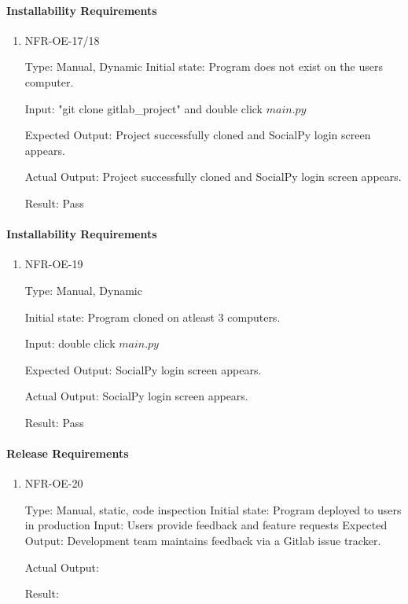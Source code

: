 \documentclass[12pt, titlepage]{article}
\begin{document}
  \paragraph{Installability Requirements}
\begin{enumerate}
    \item{NFR-OE-17/18 \\}
    
    Type: Manual, Dynamic
    Initial state: Program does not exist on the users computer.
    
    Input: "git clone gitlab\_project" and double click $main.py$
    
    Expected Output: Project successfully cloned and SocialPy login screen appears.
    
    Actual Output: Project successfully cloned and SocialPy login screen appears.
    					
    Result: Pass
    

 \end{enumerate} 
 
   \paragraph{Installability Requirements}
\begin{enumerate}
    \item{NFR-OE-19 \\}
    
    Type: Manual, Dynamic
    
    Initial state: Program cloned on atleast 3 computers.
    
    Input: double click $main.py$
    
    Expected Output: SocialPy login screen appears.
    
    Actual Output: SocialPy login screen appears.
    					
    Result: Pass
    

 \end{enumerate} 
 
    \paragraph{Release Requirements}
\begin{enumerate}
    \item{NFR-OE-20 \\}
    
    Type: Manual, static, code inspection
    Initial state: Program deployed to users in production
    Input: Users provide feedback and feature requests
    Expected Output: Development team maintains feedback via a Gitlab issue tracker.
    
    Actual Output:
    					
    Result:
    

 \end{enumerate} 
\end{document}
